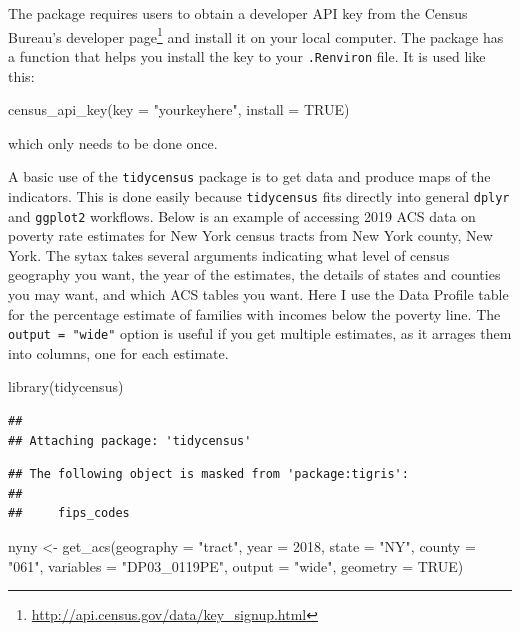 \documentclass[
]{article}
\newenvironment{Shaded}{\begin{snugshade}}{\end{snugshade}}
\newcommand{\AttributeTok}[1]{\textcolor[rgb]{0.77,0.63,0.00}{#1}}
\newcommand{\ConstantTok}[1]{\textcolor[rgb]{0.00,0.00,0.00}{#1}}
\newcommand{\DecValTok}[1]{\textcolor[rgb]{0.00,0.00,0.81}{#1}}
\newcommand{\FunctionTok}[1]{\textcolor[rgb]{0.00,0.00,0.00}{#1}}
\newcommand{\NormalTok}[1]{#1}
\newcommand{\OtherTok}[1]{\textcolor[rgb]{0.56,0.35,0.01}{#1}}
\newcommand{\StringTok}[1]{\textcolor[rgb]{0.31,0.60,0.02}{#1}}
\begin{document}
The package requires users to obtain a developer API key from the Census Bureau's developer page\footnote{\url{http://api.census.gov/data/key_signup.html}} and install it on your local computer. The package has a function that helps you install the key to your \texttt{.Renviron} file. It is used like this:

\begin{Shaded}
\begin{Highlighting}[]
\FunctionTok{census\_api\_key}\NormalTok{(}\AttributeTok{key =} \StringTok{"yourkeyhere"}\NormalTok{, }\AttributeTok{install =} \ConstantTok{TRUE}\NormalTok{)}
\end{Highlighting}
\end{Shaded}

which only needs to be done once.

A basic use of the \texttt{tidycensus} package is to get data and produce maps of the indicators. This is done easily because \texttt{tidycensus} fits directly into general \texttt{dplyr} and \texttt{ggplot2} workflows. Below is an example of accessing 2019 ACS data on poverty rate estimates for New York census tracts from New York county, New York. The sytax takes several arguments indicating what level of census geography you want, the year of the estimates, the details of states and counties you may want, and which ACS tables you want. Here I use the Data Profile table for the percentage estimate of families with incomes below the poverty line. The \texttt{output\ =\ "wide"} option is useful if you get multiple estimates, as it arrages them into columns, one for each estimate.

\begin{Shaded}
\begin{Highlighting}[]
\FunctionTok{library}\NormalTok{(tidycensus)}
\end{Highlighting}
\end{Shaded}

\begin{verbatim}
## 
## Attaching package: 'tidycensus'
\end{verbatim}

\begin{verbatim}
## The following object is masked from 'package:tigris':
## 
##     fips_codes
\end{verbatim}

\begin{Shaded}
\begin{Highlighting}[]
\NormalTok{nyny }\OtherTok{\textless{}{-}} \FunctionTok{get\_acs}\NormalTok{(}\AttributeTok{geography =} \StringTok{"tract"}\NormalTok{,}
                \AttributeTok{year =} \DecValTok{2018}\NormalTok{,}
                \AttributeTok{state =} \StringTok{"NY"}\NormalTok{,}
                \AttributeTok{county =} \StringTok{"061"}\NormalTok{,}
                \AttributeTok{variables =} \StringTok{"DP03\_0119PE"}\NormalTok{, }
                \AttributeTok{output =} \StringTok{"wide"}\NormalTok{,}
                \AttributeTok{geometry =} \ConstantTok{TRUE}\NormalTok{)}
\end{Highlighting}
\end{Shaded}
\end{document}
